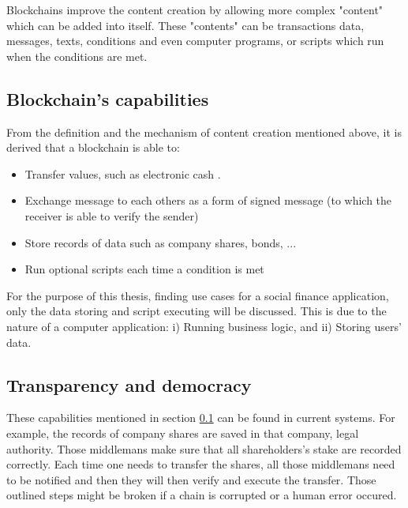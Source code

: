 \documentclass[twoside,numperchapter]{tutthesis} %
\begin{document}
Blockchains improve the content creation by allowing more complex "content" which can be added into itself. These "contents" can be transactions data, messages, texts, conditions and even computer programs, or scripts which run when the conditions are met.

\subsection{Blockchain's capabilities}
\label{blockchainCapabilities}

From the definition and the mechanism of content creation mentioned above, it is derived that a blockchain is able to:

\begin{itemize}
    \item Transfer values, such as electronic cash \citep{RefWorks:doc:BitcoinWhitepaper}.
    \item Exchange message to each others as a form of signed message (to which the receiver is able to verify the sender) \citep{RefWorks:doc:EthereumWhitepaper}
    \item Store records of data such as company shares, bonds, ... \citep{RefWorks:doc:SecuritiesOnBlockchain}
    \item Run optional scripts each time a condition is met \citep[s.~20]{RefWorks:doc:MasteringBlockchain}
\end{itemize}

For the purpose of this thesis, finding use cases for a social finance application, only the data storing and script executing will be discussed. This is due to the nature of a computer application: i) Running business logic, and ii) Storing users' data.

\subsection{Transparency and democracy}

These capabilities mentioned in section \ref{blockchainCapabilities} can be found in current systems. For example, the records of company shares are saved in that company, legal authority. Those middlemans make sure that all shareholders's stake are recorded correctly. Each time one needs to transfer the shares, all those middlemans need to be notified and then they will then verify and execute the transfer. Those outlined steps might be broken if a chain is corrupted or a human error occured.
\end{document}
